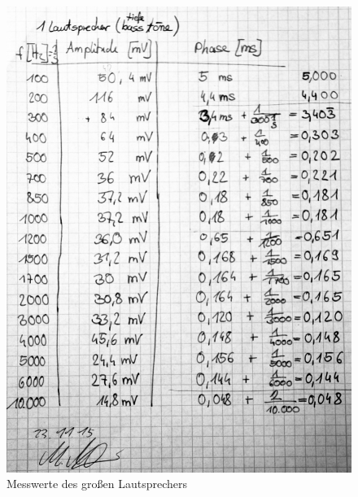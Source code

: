 \documentclass[12pt,oneside,a4paper]{report}
\begin{document}
\begin{figure}
\centering\small
\includegraphics[scale=0.6]{src/1Lautsprecher_Messwerte.jpg}
\caption{Messwerte des großen Lautsprechers}
\label{fig:LAUT_TIEF}
\end{figure}
\end{document}
